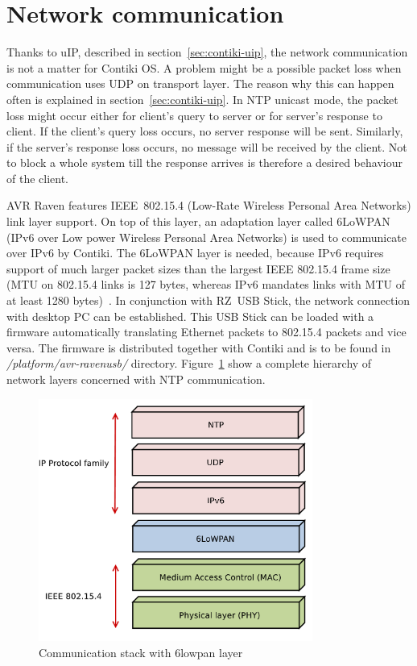 
\section{Network communication}
Thanks to uIP, described in section~\ref{sec:contiki-uip},
the network communication is not a matter for Contiki OS.
A problem might be a possible packet loss when communication uses UDP on transport layer.
The reason why this can happen often is explained in section~\ref{sec:contiki-uip}.
In NTP unicast mode, the packet loss might occur either for client's query to server
or for server's response to client.
If the client's query loss occurs, no server response will be sent.
Similarly, if the server's response loss occurs, no message will be received by the client.
Not to block a whole system till the response arrives
is therefore a desired behaviour of the client.

AVR Raven features IEEE~802.15.4 (Low-Rate Wireless Personal Area Networks) link layer support.
On top of this layer, an adaptation layer called 6LoWPAN (IPv6 over Low power Wireless Personal Area Networks)
is used to communicate over IPv6 by Contiki.
The 6LoWPAN layer is needed, because IPv6 requires support of much larger packet
sizes than the largest IEEE 802.15.4 frame size
(MTU on 802.15.4 links is 127 bytes,
whereas IPv6 mandates links with MTU of at least 1280 bytes)~\cite{interconnecting}.
In conjunction with RZ~USB Stick, the network connection with desktop PC can be established.
This USB Stick can be loaded with a firmware automatically translating
Ethernet packets to 802.15.4 packets and vice versa.
The firmware is distributed together with Contiki and
is to be found in {\it{/platform/avr-ravenusb/}} directory.
Figure~\ref{fig:design-6lowpan} show a complete hierarchy of network layers
concerned with NTP communication.
\begin{figure}
  \centering
  \includegraphics[width=9cm,keepaspectratio]{fig/6lowpan.pdf}
  \caption{Communication stack with 6lowpan layer}
  \label{fig:design-6lowpan}
  \bigskip
\end{figure}

